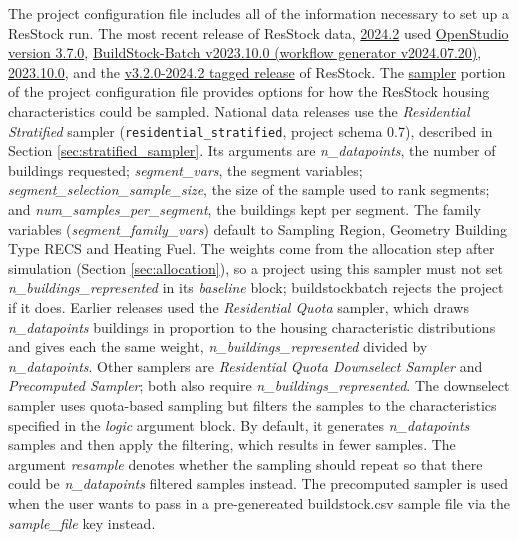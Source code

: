 The project configuration file includes all of the information necessary to set up a ResStock run. The most recent release of ResStock data, \href{https://resstock.nrel.gov/datasets}{2024.2} used
\href{https://github.com/NREL/OpenStudio/releases/tag/v3.7.0}{OpenStudio version 3.7.0}, \href{https://github.com/NREL/buildstockbatch/tree/v2023.10.0}{BuildStock-Batch v2023.10.0 (workflow generator v2024.07.20)}, \href{https://buildstockbatch.readthedocs.io/en/v2023.10.0/index.html}{2023.10.0}, and the \href{https://github.com/NREL/resstock/tree/v3.2.0-2024.2}{v3.2.0-2024.2 tagged release} of ResStock.
The \href{https://buildstockbatch.readthedocs.io/en/v2023.10.0/project_defn.html#sampler}{sampler} portion of the project configuration file provides options for how the ResStock housing characteristics could be sampled. National data releases use the \textit{Residential Stratified} sampler (\texttt{residential\_stratified}, project schema 0.7), described in Section \ref{sec:stratified_sampler}. Its arguments are \textit{n\_datapoints}, the number of buildings requested; \textit{segment\_vars}, the segment variables; \textit{segment\_selection\_sample\_size}, the size of the sample used to rank segments; and \textit{num\_samples\_per\_segment}, the buildings kept per segment. The family variables (\textit{segment\_family\_vars}) default to Sampling Region, Geometry Building Type RECS and Heating Fuel. The weights come from the allocation step after simulation (Section \ref{sec:allocation}), so a project using this sampler must not set \textit{n\_buildings\_represented} in its \textit{baseline} block; buildstockbatch rejects the project if it does. Earlier releases used the \textit{Residential Quota} sampler, which draws \textit{n\_datapoints} buildings in proportion to the housing characteristic distributions and gives each the same weight, \textit{n\_buildings\_represented} divided by \textit{n\_datapoints}. Other samplers are \textit{Residential Quota Downselect Sampler} and \textit{Precomputed Sampler}; both also require \textit{n\_buildings\_represented}. The downselect sampler uses quota-based sampling but filters the samples to the characteristics specified in the \textit{logic} argument block. By default, it generates \textit{n\_datapoints} samples and then apply the filtering, which results in fewer samples. The argument \textit{resample} denotes whether the sampling should repeat so that there could be \textit{n\_datapoints} filtered samples instead. The precomputed sampler is used when the user wants to pass in a pre-genereated buildstock.csv sample file via the \textit{sample\_file} key instead.

